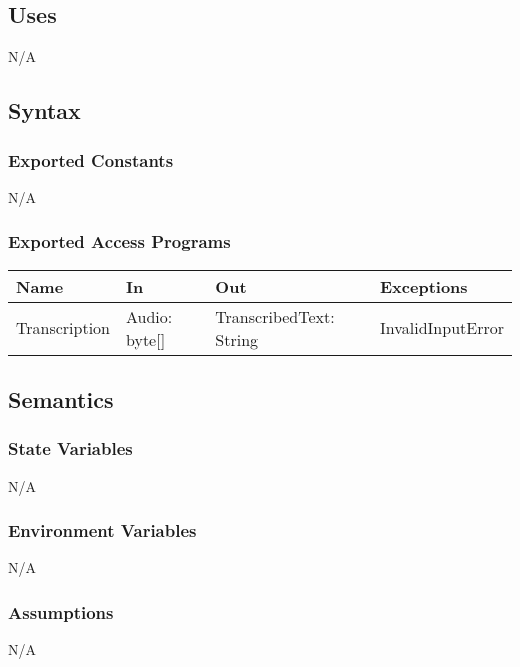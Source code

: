 \documentclass[12pt, titlepage]{article}
\begin{document}
\subsection{Uses}

N/A

\subsection{Syntax}

\subsubsection{Exported Constants}

N/A

\subsubsection{Exported Access Programs}

\begin{center}
\begin{tabular}{p{2cm} p{4cm} p{4cm} p{2cm}}
\hline
\textbf{Name} & \textbf{In} & \textbf{Out} & \textbf{Exceptions} \\
\hline
Transcription & Audio: byte[] & TranscribedText: String & InvalidInputError \\ 
\hline
\end{tabular}
\end{center}

\subsection{Semantics}

\subsubsection{State Variables}

N/A

\subsubsection{Environment Variables}

N/A

\subsubsection{Assumptions}

N/A
\end{document}
